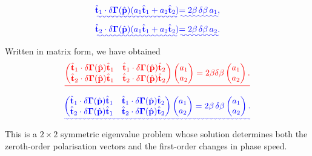 \documentclass [a4paper,12pt]{paper}
\providecommand{\DIFadd}[1]{{\protect\color{blue}\uwave{#1}}} %
\providecommand{\DIFdel}[1]{{\protect\color{red}\sout{#1}}}                      %
\providecommand{\DIFaddbegin}{} %
\providecommand{\DIFaddend}{} %
\providecommand{\DIFdelbegin}{} %
\providecommand{\DIFdelend}{} %
\begin{document}
\DIFdelend \DIFaddbegin \begin{align}
\DIFadd{\hat{\mathbf{t}}_{1}\cdot\delta\bm{\Gamma}(\hat{\mathbf{p}})(a_{1}\hat{\mathbf{t}}_{1}+a_{2}\hat{\mathbf{t}}_{2})}&\DIFadd{=2\beta\,\delta\beta\, a_{1}, \label{eq:42}}\\
\DIFadd{\hat{\mathbf{t}}_{2}\cdot\delta\bm{\Gamma}(\hat{\mathbf{p}})(a_{1}\hat{\mathbf{t}}_{1}+a_{2}\hat{\mathbf{t}}_{2})}&\DIFadd{=2\beta\,\delta\beta\, a_{2}. \label{eq:43}
}\end{align}\DIFaddend 
Written in matrix form, we have obtained
\DIFdelbegin \begin{displaymath}
\DIFdel{\begin{pmatrix} \hat{\mathbf{t}}_{1}\cdot\delta\bm{\Gamma}(\hat{\mathbf{p}})\hat{\mathbf{t}}_{1} & \hat{\mathbf{t}}_{1}
    \cdot\delta\bm{\Gamma}(\hat{\mathbf{p}})\hat{\mathbf{t}}_{2} \\ \hat{\mathbf{t}}_{2}\cdot\delta\bm{\Gamma}(\hat{\mathbf{p}})\hat{\mathbf{t}}_{1} & 
    \hat{\mathbf{t}}_{2}\cdot\delta\bm{\Gamma}(\hat{\mathbf{p}})\hat{\mathbf{t}}_{2} \end{pmatrix} \begin{pmatrix} a_{1}
         \\ a_{2} \end{pmatrix} = 2\beta\delta\beta \begin{pmatrix} a_{1} \\ a_{2} \end{pmatrix}.
}\end{displaymath}%
\DIFdelend \DIFaddbegin \begin{equation}
\DIFadd{\begin{pmatrix} \hat{\mathbf{t}}_{1}\cdot\delta\bm{\Gamma}(\hat{\mathbf{p}})\hat{\mathbf{t}}_{1} & \hat{\mathbf{t}}_{1}
    \cdot\delta\bm{\Gamma}(\hat{\mathbf{p}})\hat{\mathbf{t}}_{2} \\ \hat{\mathbf{t}}_{2}\cdot\delta\bm{\Gamma}(\hat{\mathbf{p}})\hat{\mathbf{t}}_{1} & 
    \hat{\mathbf{t}}_{2}\cdot\delta\bm{\Gamma}(\hat{\mathbf{p}})\hat{\mathbf{t}}_{2} \end{pmatrix} \begin{pmatrix} a_{1}
         \\ a_{2} \end{pmatrix} = 2\beta\,\delta\beta \begin{pmatrix} a_{1} \\ a_{2} \end{pmatrix}.
\label{eq:44}
}\end{equation}\DIFaddend 
This is a $2\times2$ symmetric eigenvalue problem whose solution determines both the zeroth-order polarisation vectors 
and the first-order changes in phase speed. 
\end{document}

